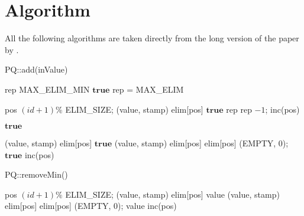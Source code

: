 
\section{Algorithm}

All the following algorithms are taken directly from the long version of the paper by \citeauthor{calciu_adaptive_2014-1} \cite{calciu_adaptive_2014-1}.

\begin{algorithm}[!htb]
	\caption{PQ::add(inValue)}
	\label{alg:add}
	\begin{algorithmic}[1]
		\State rep \attr MAX\_ELIM\_MIN
		\Else 
		\State \Return $\mathbf{true}$
		\EndIf
		\State rep = MAX\_ELIM
		\EndIf
		
		\State pos \attr $(id + 1) \% $ ELIM\_SIZE; (value, stamp) \attr 
		elim[pos]
		\State \Return $\mathbf{true}$
		\EndIf
		\EndIf
		\State rep \attr rep $- 1$; inc(pos)
		\EndWhile
		
		\State \Return $\mathbf{true}$
		\EndIf
		
		\State (value, stamp) \attr elim[pos]
		\State \Return $\mathbf{true}$
		\EndIf
		\EndIf
		\Repeat
		\State (value, stamp) \attr elim[pos]
		\State elim[pos] \attr (EMPTY, 0); \Return $\mathbf{true}$
		\EndIf    
		\EndIf
		\State inc(pos)
		\EndWhile
	\end{algorithmic}
\end{algorithm}

\begin{algorithm}[htb]
	\caption{PQ::removeMin()}
	\label{alg:removeMin}
	\begin{algorithmic}[1]
		\State pos \attr $(id + 1) \% $ ELIM\_SIZE; (value, stamp) \attr 
		elim[pos]
		\State \Return value
		\EndIf
		\EndIf
		\Repeat
		\State (value, stamp) \attr elim[pos]
		\State elim[pos] \attr (EMPTY, 0); \Return value
		\EndIf    
		\EndIf
		\State inc(pos)
		\EndWhile
	\end{algorithmic}
\end{algorithm}


